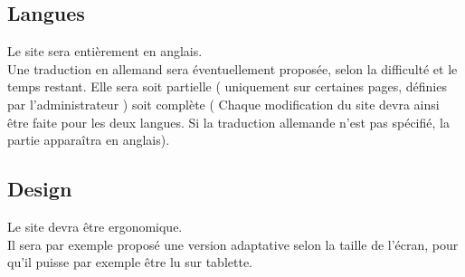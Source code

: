 \documentclass[]{article}
\begin{document}
\subsection{Langues}\label{langues}

Le site sera entièrement en anglais.\\Une traduction en allemand sera
éventuellement proposée, selon la difficulté et le temps restant. Elle
sera soit partielle ( uniquement sur certaines pages, définies par
l'administrateur ) soit complète ( Chaque modification du site devra
ainsi être faite pour les deux langues. Si la traduction allemande n'est
pas spécifié, la partie apparaîtra en anglais).

\subsection{Design}\label{design}

Le site devra être ergonomique.\\Il sera par exemple proposé une version
adaptative selon la taille de l'écran, pour qu'il puisse par exemple
être lu sur tablette.
\end{document}
